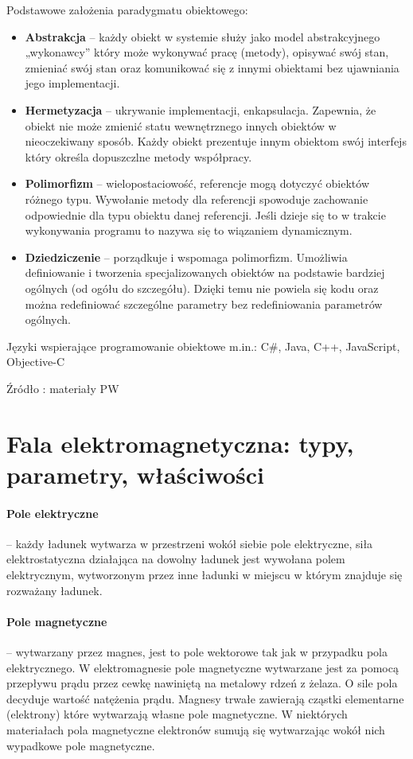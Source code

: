 \documentclass[]{report}
\begin{document}
Podstawowe założenia paradygmatu obiektowego:
\begin{itemize}
\item \textbf{Abstrakcja} – każdy obiekt w systemie służy jako model abstrakcyjnego „wykonawcy” który może wykonywać pracę (metody), opisywać swój stan, zmieniać swój stan oraz komunikować się z innymi obiektami bez ujawniania jego implementacji.
\item \textbf{Hermetyzacja} – ukrywanie implementacji, enkapsulacja. Zapewnia, że obiekt nie może zmienić statu wewnętrznego innych obiektów w nieoczekiwany sposób. Każdy obiekt prezentuje innym obiektom swój interfejs który określa dopuszczlne metody współpracy.
\item \textbf{Polimorfizm} – wielopostaciowość, referencje mogą dotyczyć obiektów różnego typu. Wywołanie metody dla referencji spowoduje zachowanie odpowiednie dla typu obiektu danej referencji. Jeśli dzieje się to w trakcie wykonywania programu to nazywa się to wiązaniem dynamicznym.
\item \textbf{Dziedziczenie} – porządkuje i wspomaga polimorfizm. Umożliwia definiowanie i tworzenia specjalizowanych obiektów na podstawie bardziej ogólnych (od ogółu do szczegółu). Dzięki temu nie powiela się kodu oraz można redefiniować szczególne parametry bez redefiniowania parametrów ogólnych.
\end{itemize}
\medskip 

Języki wspierające programowanie obiektowe m.in.: C\#, Java, C++, JavaScript, Objective-C
\medskip 

Źródło : materiały PW


\section{Fala elektromagnetyczna: typy, parametry, właściwości}
\paragraph{Pole elektryczne} – każdy ładunek wytwarza w przestrzeni wokół siebie pole elektryczne, siła elektrostatyczna działająca na dowolny ładunek jest wywołana polem elektrycznym, wytworzonym przez inne ładunki w miejscu w którym znajduje się rozważany ładunek.

\paragraph{Pole magnetyczne} – wytwarzany przez magnes, jest to pole wektorowe tak jak w przypadku pola elektrycznego. W elektromagnesie pole magnetyczne wytwarzane jest za pomocą przepływu prądu przez cewkę nawiniętą na metalowy rdzeń z żelaza. O sile pola decyduje wartość natężenia prądu. Magnesy trwałe zawierają cząstki elementarne (elektrony) które wytwarzają własne pole magnetyczne. W niektórych materiałach pola magnetyczne elektronów sumują się wytwarzając wokół nich wypadkowe pole magnetyczne.
\end{document}

